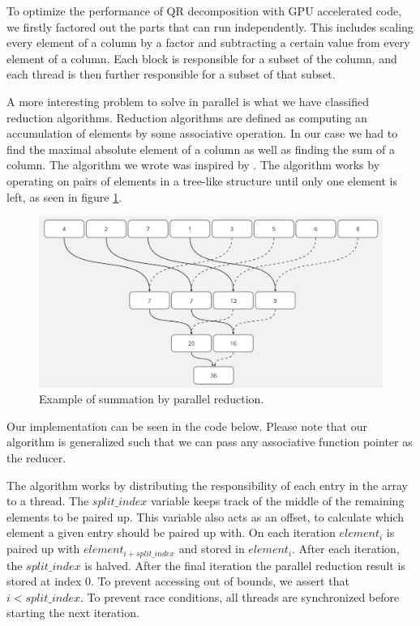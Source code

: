 To optimize the performance of QR decomposition with GPU accelerated code, we firstly factored out the parts that can run independently. This includes scaling every element of a column by a factor and subtracting a certain value from every element of a column. Each block is responsible for a subset of the column, and each thread is then further responsible for a subset of that subset.

A more interesting problem to solve in parallel is what we have classified reduction algorithms. Reduction algorithms are defined as computing an accumulation of elements by some associative operation. In our case we had to find the maximal absolute element of a column as well as finding the sum of a column. The algorithm we wrote was inspired by \cite{parallelreduction}. The algorithm works by operating on pairs of elements in a tree-like structure until only one element is left, as seen in figure \ref{fig:parallel reduction}. 

\begin{figure}[ht]
\includegraphics[width=\textwidth]{Documents/Report/Figures/parallel_sum.png}
\caption{Example of summation by parallel reduction.}
\label{fig:parallel reduction}
\end{figure}

Our implementation can be seen in the code below. Please note that our algorithm is generalized such that we can pass any associative function pointer as the reducer.

The algorithm works by distributing the responsibility of each entry in the array to a thread. The $split\_index$ variable keeps track of the middle of the remaining elements to be paired up. This variable also acts as an offset, to calculate which element a given entry should be paired up with. On each iteration $element_i$ is paired up with $element_{i + split\_index}$ and stored in $element_i$. After each iteration, the $split\_index$ is halved. After the final iteration the parallel reduction result is stored at index 0. To prevent accessing out of bounds, we assert that $i < split\_index$. To prevent race conditions, all threads are synchronized before starting the next iteration. 

